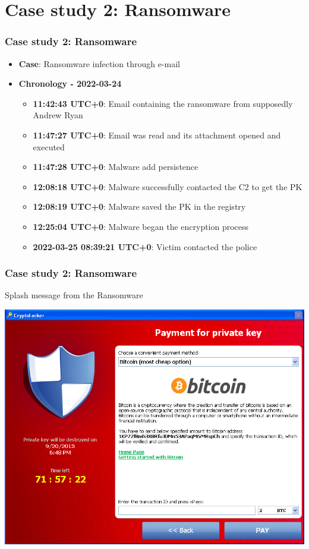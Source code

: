 %
%
%
%

\section{Case study 2: Ransomware}
\begin{frame}
    \frametitle{Case study 2: Ransomware}
    \begin{itemize}
        \item[] \textbf{Case}: Ransomware infection through e-mail
        \item[] \textbf{Chronology - 2022-03-24}
        \begin{itemize}
            \item[] \textbf{\small 11:42:43 UTC+0}: Email containing the ransomware from supposedly Andrew Ryan
            \item[] \textbf{\small 11:47:27 UTC+0}: Email was read and its attachment opened and executed
            \item[] \textbf{\small 11:47:28 UTC+0}: Malware add persistence
            \item[] \textbf{\small 12:08:18 UTC+0}: Malware successfully contacted the C2 to get the PK 
            \item[] \textbf{\small 12:08:19 UTC+0}: Malware saved the PK in the registry
            \item[] \textbf{\small 12:25:04 UTC+0}: Malware began the encryption process
            \item[] \textbf{\small 2022-03-25 08:39:21 UTC+0}: Victim contacted the police
        \end{itemize}
    \end{itemize}
\end{frame}

\begin{frame}
    \frametitle{Case study 2: Ransomware}
    Splash message from the Ransomware
    \begin{center}
        \includegraphics[width=0.8\linewidth]{./pictures/case2/ransom-btc.png}
    \end{center}
\end{frame}

